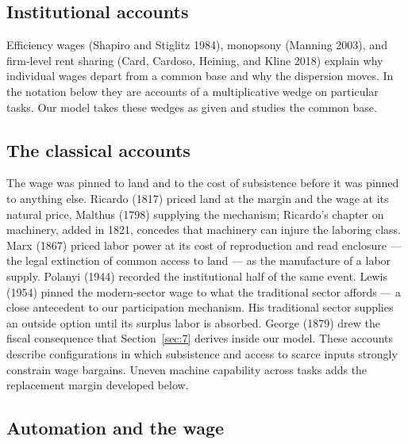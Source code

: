 \documentclass[12pt]{article}
\theoremstyle{plain}
\begin{document}
\subsection{Institutional accounts}\label{sec:2.4}

Efficiency wages (Shapiro and Stiglitz 1984), monopsony (Manning 2003), and firm-level rent sharing (Card, Cardoso, Heining, and Kline 2018) explain why individual wages depart from a common base and why the dispersion moves. In the notation below they are accounts of a multiplicative wedge on particular tasks. Our model takes these wedges as given and studies the common base.

\subsection{The classical accounts}\label{sec:2.5}

The wage was pinned to land and to the cost of subsistence before it was pinned to anything else. Ricardo (1817) priced land at the margin and the wage at its natural price, Malthus (1798) supplying the mechanism; Ricardo's chapter on machinery, added in 1821, concedes that machinery can injure the laboring class. Marx (1867) priced labor power at its cost of reproduction and read enclosure --- the legal extinction of common access to land --- as the manufacture of a labor supply. Polanyi (1944) recorded the institutional half of the same event. Lewis (1954) pinned the modern-sector wage to what the traditional sector affords --- a close antecedent to our participation mechanism. His traditional sector supplies an outside option until its surplus labor is absorbed. George (1879) drew the fiscal consequence that Section~\ref{sec:7} derives inside our model. These accounts describe configurations in which subsistence and access to scarce inputs strongly constrain wage bargains. Uneven machine capability across tasks adds the replacement margin developed below.

\subsection{Automation and the wage}\label{sec:2.6}
\end{document}
